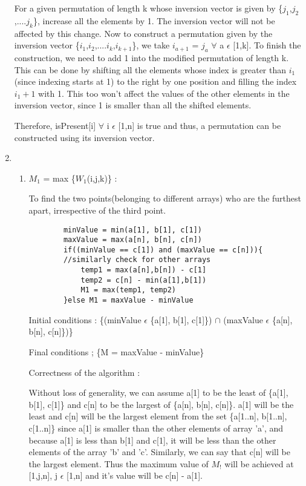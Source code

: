 \documentclass[12pt]{article}
\begin{document}
\begin{enumerate}
    For a given permutation of length k whose inversion vector is given by \{$j_1$,$j_2$,....$j_k$\}, increase all the elements by 1. The inversion vector will not be affected by this change. Now to construct a permutation given by the inversion vector \{$i_1$,$i_2$,....$i_k$,$i_{k+1}$\}, we take $i_{a+1}$ = $j_a$ $\forall$ a $\epsilon$ [1,k]. To finish the construction, we need to add 1 into the modified permutation of length k. This can be done by shifting all the elements whose index is greater than $i_1$ (since indexing starts at 1) to the right by one position and filling the index $i_1+1$ with 1. This too won't affect the values of the other elements in the inversion vector, since 1 is smaller than all the shifted elements.
    
    Therefore, isPresent[i] $\forall$ i $\epsilon$ [1,n] is true and thus, a permutation can be constructed using its inversion vector.
    
    \item\begin{enumerate}
        \item $M_1$ = max \{$W_1$(i,j,k)\} :
        
        To find the two points(belonging to different arrays) who are the furthest apart, irrespective of the third point.
        \begin{verbatim}
        minValue = min(a[1], b[1], c[1])
        maxValue = max(a[n], b[n], c[n])
        if((minValue == c[1]) and (maxValue == c[n])){ 
        //similarly check for other arrays
            temp1 = max(a[n],b[n]) - c[1]
            temp2 = c[n] - min(a[1],b[1])
            M1 = max(temp1, temp2)
        }else M1 = maxValue - minValue
        \end{verbatim}
        Initial conditions : \{(minValue $\epsilon$ \{a[1], b[1], c[1]\}) $\cap$ (maxValue $\epsilon$ \{a[n], b[n], c[n]\})\} 
        
        Final conditions ; \{M = maxValue - minValue\}
        
        Correctness of the algorithm :
        
        Without loss of generality, we can assume a[1] to be the least of \{a[1], b[1], c[1]\} and c[n] to be the largest of \{a[n], b[n], c[n]\}. a[1] will be the least and c[n] will be the largest element from the set \{a[1..n], b[1..n], c[1..n]\} since a[1] is smaller than the other elements of array 'a', and because a[1] is less than b[1] and c[1], it will be less than the other elements of the array 'b' and 'c'. Similarly, we can say that c[n] will be the largest element. Thus the maximum value of $M_!$ will be achieved at [1,j,n], j $\epsilon$ [1,n]
        and it's value will be c[n] - a[1].
        

\end{enumerate}
\end{enumerate}
\end{document}
